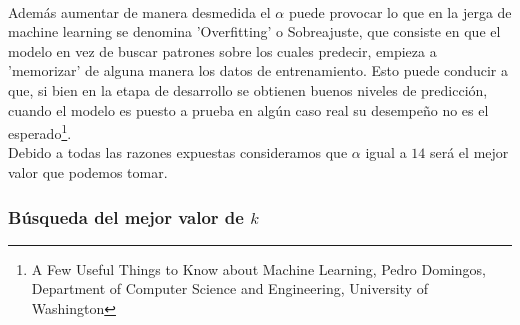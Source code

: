 \\
Además aumentar de manera desmedida el $\alpha$ puede provocar lo que en la jerga de machine learning se denomina 'Overfitting' o Sobreajuste, que consiste en que el modelo en vez de buscar patrones sobre los cuales predecir, empieza a 'memorizar' de alguna manera los datos de entrenamiento. Esto puede conducir a que, si bien en la etapa de desarrollo se obtienen buenos niveles de predicción, cuando el modelo es puesto a prueba en algún caso real su desempeño no es el esperado\footnote{\label{note1}A Few Useful Things to Know about Machine Learning, Pedro Domingos, Department of Computer Science and Engineering, University of Washington}.
\\
Debido a todas las razones expuestas consideramos que $\alpha$ igual a $14$ será el mejor valor que podemos tomar.
\\
\subsubsection{Búsqueda del mejor valor de $k$}

